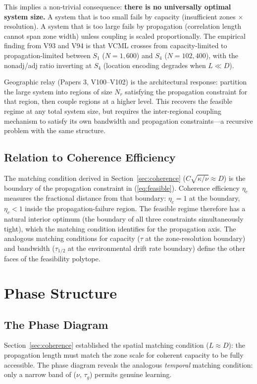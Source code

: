 \documentclass[11pt]{article}
\begin{document}
This implies a non-trivial consequence: \textbf{there is no universally optimal system size.}
A system that is too small fails by capacity (insufficient zones $\times$ resolution).
A system that is too large fails by propagation (correlation length cannot span zone width) unless coupling is scaled proportionally.
The empirical finding from V93 and V94 is that VCML crosses from capacity-limited to propagation-limited between $S_1$ ($N=1{,}600$) and $S_4$ ($N=102{,}400$), with the nonadj/adj ratio inverting at $S_4$ (location encoding degrades when $L \ll D$).

Geographic relay (Papers 3, V100--V102) is the architectural response: partition the large system into regions of size $N_r$ satisfying the propagation constraint for that region, then couple regions at a higher level.
This recovers the feasible regime at any total system size, but requires the inter-regional coupling mechanism to satisfy its own bandwidth and propagation constraints---a recursive problem with the same structure.

\subsection{Relation to Coherence Efficiency}

The matching condition derived in Section~\ref{sec:coherence} ($C\sqrt{\kappa/\nu} \approx D$) is the boundary of the propagation constraint in (\ref{eq:feasible}).
Coherence efficiency $\eta_c$ measures the fractional distance from that boundary: $\eta_c = 1$ at the boundary, $\eta_c < 1$ inside the propagation-failure region.
The feasible regime therefore has a natural interior optimum (the boundary of all three constraints simultaneously tight), which the matching condition identifies for the propagation axis.
The analogous matching conditions for capacity ($\tau$ at the zone-resolution boundary) and bandwidth ($\tau_{1/2}$ at the environmental drift rate boundary) define the other faces of the feasibility polytope.

\section{Phase Structure}
\label{sec:phase}

\subsection{The Phase Diagram}

Section~\ref{sec:coherence} established the spatial matching condition ($L \approx D$): the propagation length must match the zone scale for coherent capacity to be fully accessible. The phase diagram reveals the analogous \emph{temporal} matching condition: only a narrow band of ($\nu$, $\tau_g$) permits genuine learning.
\end{document}
